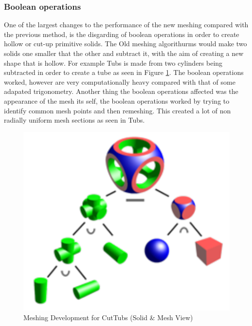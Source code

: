 \documentclass[12pt,a4paper]{article}
\begin{document}
\subsubsection{Boolean operations}
\label{bool}
One of the largest changes to the performance of the new meshing compared with the previous method, is the disgarding of boolean operations in order to create hollow or cut-up primitive solids. The Old meshing algorithurms would make two solids one smaller that the other and subtract it, with the aim of creating a new shape that is hollow. For example Tubs is made from two cylinders being subtracted in order to create a tube as seen in Figure \ref{tubspic}. The boolean operations worked, however are very computationally heavy compared with that of some adapated trigonometry. Another thing the boolean operations affected was the appearance of the mesh its self, the boolean operations worked by trying to identify common mesh points and then remeshing. This created a lot of non radially uniform mesh sections as seen in Tubs.

\begin{figure}[h!]
\centering
\includegraphics[scale=1]{Images//Booleans//Boolean.pdf}
\caption[width=\columnwidth]{Meshing Development for CutTubs (Solid \& Mesh View)}
\label{tubspic}
\end{figure}
\end{document}
